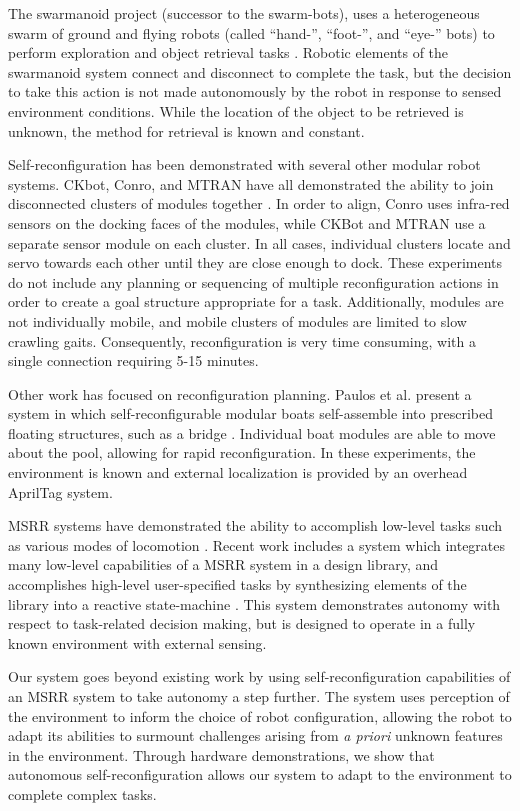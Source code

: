 \documentclass[12pt]{article}
\begin{document}
The swarmanoid project (successor to the swarm-bots), uses a heterogeneous swarm of ground and flying robots (called ``hand-'', ``foot-'', and ``eye-'' bots) to perform exploration and object retrieval tasks  \cite{Dorigo2013}. Robotic elements of the swarmanoid system connect and disconnect to complete the task, but the decision to take this action is not made autonomously by the robot in response to sensed environment conditions. While the location of the object to be retrieved is unknown, the method for retrieval is known and constant.

Self-reconfiguration has been demonstrated with several other modular robot systems. CKbot, Conro, and MTRAN have all demonstrated the ability to join disconnected clusters of modules together \cite{Yim2007, Rubenstein2004,Murata2006}. In order to align, Conro uses infra-red sensors on the docking faces of the modules, while CKBot and MTRAN use a separate sensor module on each cluster.  In all cases, individual clusters locate and servo towards each other until they are close enough to dock. These experiments do not include any planning or sequencing of multiple reconfiguration actions in order to create a goal structure appropriate for a task.  Additionally,  modules are not individually mobile, and mobile clusters of modules are limited to slow crawling gaits.  Consequently, reconfiguration is very time consuming, with a single connection requiring 5-15 minutes.

Other work has focused on reconfiguration planning.  Paulos et al. present a system in which self-reconfigurable modular boats self-assemble into prescribed floating structures, such as a bridge \cite{Paulos2015}.  Individual boat modules are able to move about the pool, allowing for rapid reconfiguration.  In these experiments, the environment is known and external localization is provided by an overhead AprilTag system. 

MSRR systems have demonstrated the ability to accomplish low-level tasks such as various modes of locomotion \cite{Yim1994}.
Recent work includes a system which integrates many low-level capabilities of a MSRR system in a design library, and accomplishes high-level user-specified tasks by synthesizing elements of the library into a reactive state-machine \cite{Jing2016}. This system demonstrates autonomy with respect to task-related decision making, but is designed to operate in a fully known environment with external sensing.

Our system goes beyond existing work by using self-reconfiguration capabilities of an MSRR system to take autonomy a step further.  The system uses perception of the environment to inform the choice of robot configuration, allowing the robot to adapt its abilities to surmount challenges arising from \textit{a priori} unknown features in the environment. Through hardware demonstrations, we show that autonomous self-reconfiguration allows our system to adapt to the environment to complete complex tasks.
\end{document}
